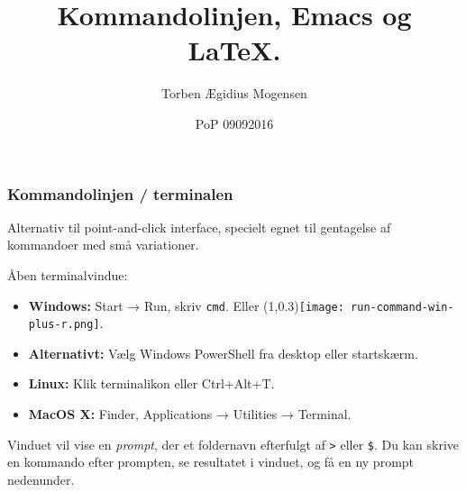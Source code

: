 \documentclass{beamer}
\title{Kommandolinjen, Emacs og \LaTeX.}
\date[2016]{PoP 09092016}
\author{Torben Ægidius Mogensen}
\begin{document}
\begin{frame}
\titlepage
\end{frame}






\begin{frame}
\frametitle{Kommandolinjen / terminalen}

Alternativ til point-and-click interface, specielt egnet til
gentagelse af kommandoer med små variationer.

\vspace{1ex}

Åben terminalvindue:

\begin{itemize}
\item \textbf{Windows:} Start → Run, skriv \texttt{cmd}.  Eller
  \makebox(1,0.3){\texttt{[image: run-command-win-plus-r.png]}}.
\item \textbf{Alternativt:} Vælg Windows PowerShell fra
  desktop eller startskærm.
\item \textbf{Linux:} Klik terminalikon eller Ctrl+Alt+T.
\item \textbf{MacOS X:} Finder, Applications → Utilities → Terminal.
\end{itemize}

Vinduet vil vise en \emph{prompt}, der et foldernavn efterfulgt af
\texttt{>} eller \texttt{\$}.  Du kan skrive en kommando efter
prompten, se resultatet i vinduet, og få en ny prompt nedenunder.

\end{frame}
\end{document}
